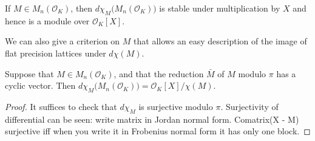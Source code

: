 \documentclass{sig-alternate-05-2015}
\newcommand{\OK}{\mathcal{O}_K}
\begin{document}
\begin{cor}
If $M \in M_n(\OK)$, then $d \chi_M \big(M_n(\OK)\big)$ 
is stable under multiplication by $X$ and hence is a module over $\OK[X]$.
\end{cor}

We can also give a criterion on $M$ that allows an easy description of the image of flat
precision lattices under $d\chi(M)$.
\begin{prop}
Suppose that $M \in M_n(\OK)$, and that the reduction $\bar{M}$ of $M$ modulo $\pi$ has
a cyclic vector.  Then $d\chi_M\big(M_n(\OK)\big) = \OK[X] / \chi(M)$.
\end{prop}
\begin{proof}
It suffices to check that $d\chi_M$ is surjective modulo $\pi$.
Surjectivity of differential
can be seen: write matrix in Jordan normal form.  Comatrix(X - M) surjective iff when you write it
in Frobenius normal form it has only one block.
\end{proof}
\end{document}

